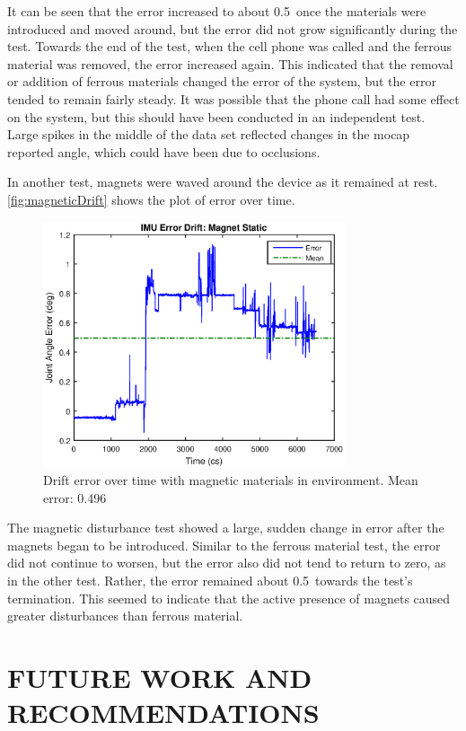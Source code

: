 \documentclass[letterpaper, 10 pt, conference]{ieeeconf}  %
\begin{document}
It can be seen that the error increased to about 0.5\degree\ once the materials were introduced and moved around, but the error did not grow significantly during the test. Towards the end of the test, when the cell phone was called and the ferrous material was removed, the error increased again. This indicated that the removal or addition of ferrous materials changed the error of the system, but the error tended to remain fairly steady. It was possible that the phone call had some effect on the system, but this should have been conducted in an independent test. Large spikes in the middle of the data set reflected changes in the mocap reported angle, which could have been due to occlusions.

In another test, magnets were waved around the device as it remained at rest. \autoref{fig:magneticDrift} shows the plot of error over time.
\begin{figure}[thpb]
	\centering
	\includegraphics[width = 3.5in]{magnet_static_drift.eps}
    \caption{Drift error over time with magnetic materials in environment. Mean error: 0.496\degree}
    \label{fig:magneticDrift}
\end{figure}

The magnetic disturbance test showed a large, sudden change in error after the magnets began to be introduced. Similar to the ferrous material test, the error did not continue to worsen, but the error also did not tend to return to zero, as in the other test. Rather, the error remained about 0.5\degree\ towards the test's termination. This seemed to indicate that the active presence of magnets caused greater disturbances than ferrous material. 

\section{FUTURE WORK AND RECOMMENDATIONS}
\end{document}
